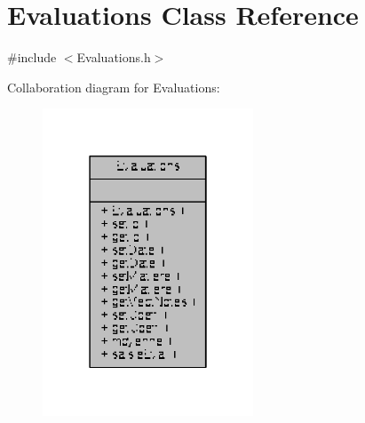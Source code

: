 \hypertarget{class_evaluations}{\section{Evaluations Class Reference}
\label{class_evaluations}
}


{\ttfamily \#include $<$Evaluations.\+h$>$}



Collaboration diagram for Evaluations\+:\nopagebreak
\begin{figure}[H]
\begin{center}
\leavevmode
\includegraphics[width=178pt]{class_evaluations__coll__graph}
\end{center}
\end{figure}
